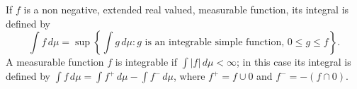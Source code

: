 If $f$ is a non negative, extended real valued, measurable function, its integral is defined by
$$\int f \,d\mu = \sup \left\{ \int g \,d\mu : g \text{ is an integrable simple function, } 0 \leq g \leq f \right\}.$$
A measurable function $f$ is integrable if $\int |f| \,d\mu < \infty$; in this case its integral is defined by $\int f \,d\mu = \int f^+ \,d\mu - \int f^- \,d\mu$, where $f^+ = f \cup 0$ and $f^- = -(f \cap 0)$.
